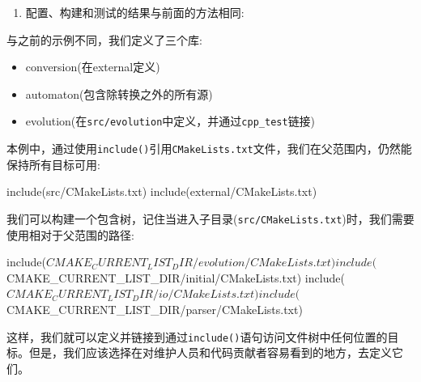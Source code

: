 \begin{enumerate}

\item 配置、构建和测试的结果与前面的方法相同:


\end{enumerate}


与之前的示例不同，我们定义了三个库:

\begin{itemize}
\item conversion(在external定义)

\item automaton(包含除转换之外的所有源)

\item evolution(在\texttt{src/evolution}中定义，并通过\texttt{cpp\_test}链接)

\end{itemize}

本例中，通过使用\texttt{include()}引用\texttt{CMakeLists.txt}文件，我们在父范围内，仍然能保持所有目标可用:

\begin{codebox}[cmake]
include(src/CMakeLists.txt)
include(external/CMakeLists.txt)
\end{codebox}

我们可以构建一个包含树，记住当进入子目录(\texttt{src/CMakeLists.txt})时，我们需要使用相对于父范围的路径:

\begin{codebox}[cmake]
include(${CMAKE_CURRENT_LIST_DIR}/evolution/CMakeLists.txt)
include(${CMAKE_CURRENT_LIST_DIR}/initial/CMakeLists.txt)
include(${CMAKE_CURRENT_LIST_DIR}/io/CMakeLists.txt)
include(${CMAKE_CURRENT_LIST_DIR}/parser/CMakeLists.txt)
\end{codebox}

这样，我们就可以定义并链接到通过\texttt{include()}语句访问文件树中任何位置的目标。但是，我们应该选择在对维护人员和代码贡献者容易看到的地方，去定义它们。

